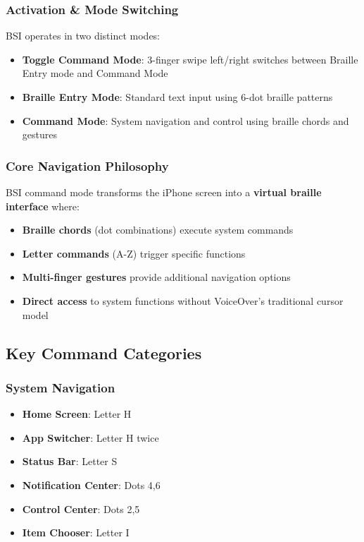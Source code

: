 \subsubsection{Activation \& Mode Switching}
BSI operates in two distinct modes:
\begin{itemize}
	\item \textbf{Toggle Command Mode}: 3-finger swipe left/right switches between Braille Entry mode and Command Mode
	\item \textbf{Braille Entry Mode}: Standard text input using 6-dot braille patterns
	\item \textbf{Command Mode}: System navigation and control using braille chords and gestures
\end{itemize}

\subsubsection{Core Navigation Philosophy}
BSI command mode transforms the iPhone screen into a \textbf{virtual braille interface} where:
\begin{itemize}
	\item \textbf{Braille chords} (dot combinations) execute system commands
	\item \textbf{Letter commands} (A-Z) trigger specific functions
	\item \textbf{Multi-finger gestures} provide additional navigation options
	\item \textbf{Direct access} to system functions without VoiceOver's traditional cursor model
\end{itemize}

\subsection{Key Command Categories}

\subsubsection{System Navigation}
\begin{itemize}
	\item \textbf{Home Screen}: Letter H
	\item \textbf{App Switcher}: Letter H twice
	\item \textbf{Status Bar}: Letter S
	\item \textbf{Notification Center}: Dots 4,6
	\item \textbf{Control Center}: Dots 2,5
	\item \textbf{Item Chooser}: Letter I
\end{itemize}

